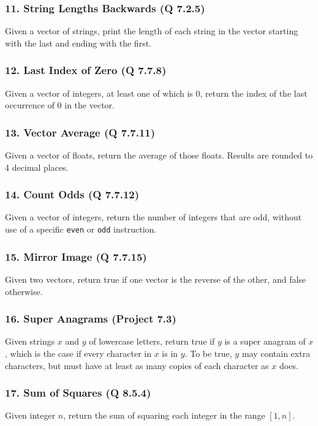 \documentclass{sig-alternate}
\begin{document}
\subsubsection*{11. String Lengths Backwards (Q 7.2.5)}
Given a vector of strings, print the length of each string in the vector starting with the last and ending with the first.

\subsubsection*{12. Last Index of Zero (Q 7.7.8)}
Given a vector of integers, at least one of which is 0, return the index of the last occurrence of 0 in the vector.

\subsubsection*{13. Vector Average (Q 7.7.11)}
Given a vector of floats, return the average of those floats. Results are rounded to 4 decimal places.

\subsubsection*{14. Count Odds (Q 7.7.12)}
Given a vector of integers, return the number of integers that are odd, without use of a specific \texttt{even} or \texttt{odd} instruction.

\subsubsection*{15. Mirror Image (Q 7.7.15)}
Given two vectors, return true if one vector is the reverse of the other, and false otherwise.

\subsubsection*{16. Super Anagrams (Project 7.3)}
Given strings $x$ and $y$ of lowercase letters, return true if $y$ is a super anagram of $x$, which is the case if every character in $x$ is in $y$. To be true, $y$ may contain extra characters, but must have at least as many copies of each character as $x$ does.

\subsubsection*{17. Sum of Squares (Q 8.5.4)}
Given integer $n$, return the sum of squaring each integer in the range $[1, n]$.
\end{document}
